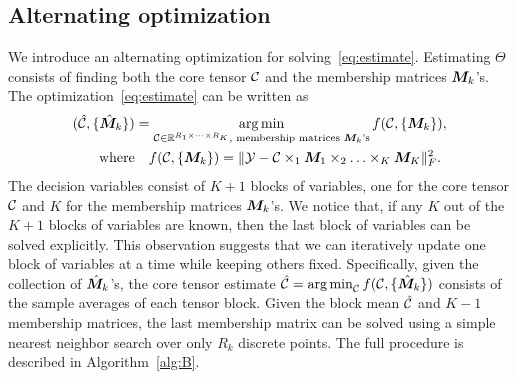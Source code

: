 \documentclass{article}
\begin{document}
\subsection{Alternating optimization}
We introduce an alternating optimization for solving~\eqref{eq:estimate}. Estimating $\Theta$ consists of finding both the core tensor $\mathcal{C}$ and the membership matrices $\bm M_k$'s. The optimization~\eqref{eq:estimate} can be written as
\begin{align}\label{eq:op}
(\hat {\mathcal{C}}, \{\hat {\bm M}_k\})&=\operatorname*{arg\,min}_{\mathcal{C}\in\mathbb{R}^{R_1\times \cdots \times R_K}, \text{ membership matrices $\bm M_k$'s}} f(\mathcal{C},\{\bm M_k\}),\notag\\
 \text{where}&\quad f(\mathcal{C},\{\bm M_k\})=\lVert\mathcal{Y}-\mathcal{C}\times_1\bm M_1\times_2\ldots\times_K\bm M_K\rVert_F^2.\notag
\end{align}
The decision variables consist of $K+1$ blocks of variables, one for the core tensor $\mathcal{C}$ and $K$ for the membership matrices $\bm M_k$'s. We notice that, if any $K$ out of the $K+1$ blocks of variables are known, then the last block of variables can be solved explicitly. This observation suggests that we can iteratively update one block of variables at a time while keeping others fixed. Specifically, given the collection of $\hat {\bm M}_k$'s, the core tensor estimate $\hat {\mathcal{C}}=\operatorname*{arg\,min}_{\mathcal{C}}f(\mathcal{C},\{\hat {\bm M}_k\})$ consists of the sample averages of each tensor block. Given the block mean $\hat {\mathcal{C}}$ and $K-1$ membership matrices, the last membership matrix can be solved using a simple nearest neighbor search over only $R_k$ discrete points. The full procedure is described in Algorithm~\ref{alg:B}.
\end{document}
